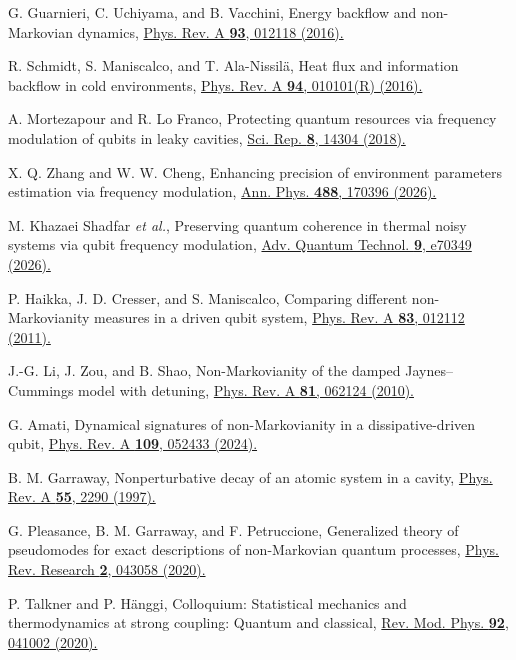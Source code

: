 \documentclass[reprint,superscriptaddress,floatfix,amsmath,amssymb,prresearch,aps]{revtex4-2}
\newcommand{\doilink}[2]{\href{https://doi.org/#1}{#2}}
\begin{document}
\begin{thebibliography}{99}
G. Guarnieri, C. Uchiyama, and B. Vacchini,
Energy backflow and non-Markovian dynamics,
\doilink{10.1103/PhysRevA.93.012118}{Phys. Rev. A \textbf{93}, 012118 (2016).}

R. Schmidt, S. Maniscalco, and T. Ala-Nissil\"a,
Heat flux and information backflow in cold environments,
\doilink{10.1103/PhysRevA.94.010101}{Phys. Rev. A \textbf{94}, 010101(R) (2016).}

A. Mortezapour and R. Lo Franco,
Protecting quantum resources via frequency modulation of qubits in leaky
cavities,
\doilink{10.1038/s41598-018-32661-2}{Sci. Rep. \textbf{8}, 14304 (2018).}

X. Q. Zhang and W. W. Cheng,
Enhancing precision of environment parameters estimation via frequency
modulation,
\doilink{10.1016/j.aop.2026.170396}{Ann. Phys. \textbf{488}, 170396 (2026).}

M. Khazaei Shadfar \textit{et al.},
Preserving quantum coherence in thermal noisy systems via qubit frequency
modulation,
\doilink{10.1002/qute.70349}{Adv. Quantum Technol. \textbf{9}, e70349 (2026).}

P. Haikka, J. D. Cresser, and S. Maniscalco,
Comparing different non-Markovianity measures in a driven qubit system,
\doilink{10.1103/PhysRevA.83.012112}{Phys. Rev. A \textbf{83}, 012112 (2011).}

J.-G. Li, J. Zou, and B. Shao,
Non-Markovianity of the damped Jaynes--Cummings model with detuning,
\doilink{10.1103/PhysRevA.81.062124}{Phys. Rev. A \textbf{81}, 062124 (2010).}

G. Amati,
Dynamical signatures of non-Markovianity in a dissipative-driven qubit,
\doilink{10.1103/PhysRevA.109.052433}{Phys. Rev. A \textbf{109}, 052433 (2024).}

B. M. Garraway,
Nonperturbative decay of an atomic system in a cavity,
\doilink{10.1103/PhysRevA.55.2290}{Phys. Rev. A \textbf{55}, 2290 (1997).}

G. Pleasance, B. M. Garraway, and F. Petruccione,
Generalized theory of pseudomodes for exact descriptions of non-Markovian
quantum processes,
\doilink{10.1103/PhysRevResearch.2.043058}{Phys. Rev. Research \textbf{2}, 043058 (2020).}

P. Talkner and P. H\"anggi,
Colloquium: Statistical mechanics and thermodynamics at strong coupling:
Quantum and classical,
\doilink{10.1103/RevModPhys.92.041002}{Rev. Mod. Phys. \textbf{92}, 041002 (2020).}


\end{thebibliography}
\end{document}
